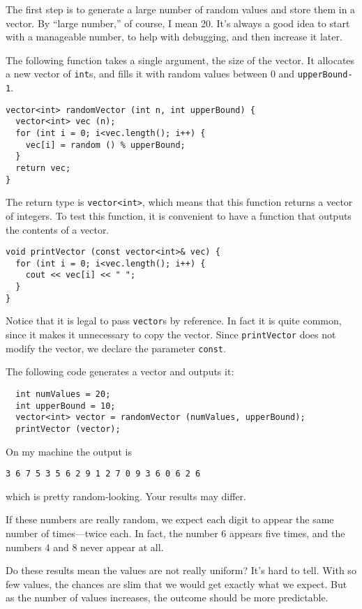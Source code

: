 The first step is to generate a large number of random values
and store them in a vector.  By ``large number,'' of course,
I mean 20.  It's always a good idea to start with a manageable
number, to help with debugging, and then increase it later.

The following function takes a single argument, the size of
the vector.  It allocates a new vector of {\tt int}s, 
and fills it with random values between 0 and {\tt upperBound-1}.

\begin{verbatim}
vector<int> randomVector (int n, int upperBound) {
  vector<int> vec (n);
  for (int i = 0; i<vec.length(); i++) {
    vec[i] = random () % upperBound;
  }
  return vec;
}
\end{verbatim}
%
The return type is {\tt vector<int>}, which means that
this function returns a vector of integers.
To test this function, it is convenient to have a function that
outputs the contents of a vector.

\begin{verbatim}
void printVector (const vector<int>& vec) {
  for (int i = 0; i<vec.length(); i++) {
    cout << vec[i] << " ";
  }
}
\end{verbatim}
%
Notice that it is legal to pass {\tt vector}s by reference.
In fact it is quite common, since it makes it unnecessary to
copy the vector.  Since {\tt printVector} does not modify the
vector, we declare the parameter {\tt const}.

The following code generates a vector and outputs it:

\begin{verbatim}
  int numValues = 20;
  int upperBound = 10;
  vector<int> vector = randomVector (numValues, upperBound);
  printVector (vector);
\end{verbatim}
%
On my machine the output is

\begin{verbatim}
3 6 7 5 3 5 6 2 9 1 2 7 0 9 3 6 0 6 2 6 
\end{verbatim}
%
which is pretty random-looking.  Your results may differ.

If these numbers are really random,
we expect each digit to appear the same number of times---twice
each.  In fact, the number 6 appears five times, and the numbers 4
and 8 never appear at all.

Do these results mean the values are not really uniform?  It's
hard to tell.  With so few values, the chances are slim
that we would get exactly what we expect.  But as the number
of values increases, the outcome should be more predictable.

